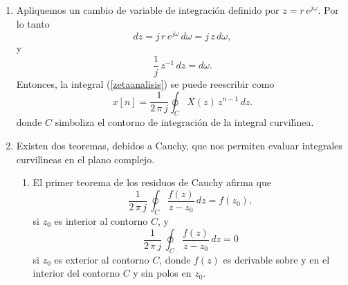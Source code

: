 \begin{enumerate}
        \item Apliquemos un cambio de variable de integraci\'{o}n definido por $z = r \, e^{j \omega}$. 
          Por lo tanto
          \begin{equation}
            dz = j \, r \, e^{j \omega} \, d \omega = j \, z \, d\omega,
          \end{equation}
          y 
          \begin{equation}
            \frac{1}{j} \, z^{-1} \, dz = d\omega.
          \end{equation}
          Entonces, la integral (\ref{zetaanalisis}) se puede reescribir como
          \begin{equation}
            x[n] = \frac{1}{2 \, \pi \, j} \oint_{C} X(z) \, z^{n-1} \, dz.
          \end{equation}
          donde $C$ simboliza el contorno de integraci\'{o}n de la integral curvil\'{\i}nea.

          \item Existen dos teoremas, debidos a Cauchy, que nos permiten evaluar integrales 
          curvil\'{\i}neas en el plano complejo.

          \begin{enumerate}

             \item El primer teorema de los  residuos de Cauchy afirma que
                \begin{equation}
                   \frac{1}{2 \, \pi \, j} \, \oint_{C} \frac{f(z)}{z-z_{0}} \, dz = 
                   f(z_{0}),
                \end{equation}
                si $z_{0}$ es interior al contorno $C$, y
               \begin{equation}
                   \frac{1}{2 \, \pi \, j} \, \oint_{C} \frac{f(z)}{z-z_{0}} \, dz = 0
               \end{equation}
               si $z_{0}$ es exterior al contorno $C$, donde $f(z)$ es derivable sobre y en el interior 
               del contorno $C$ y sin polos en $z_{0}$.
         

\end{enumerate}
\end{enumerate}
